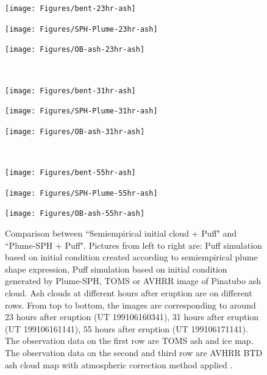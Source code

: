 \documentclass[draft,linenumbers]{agujournal2019}
\begin{document}
\begin{figure}[!htb]
    \centering
    \begin{minipage}{.325\textwidth}
        \centering
        \texttt{[image: Figures/bent-23hr-ash]}
    \end{minipage}%
    \begin{minipage}{.325 \textwidth}
        \centering
        \texttt{[image: Figures/SPH-Plume-23hr-ash]}
    \end{minipage}%
    \begin{minipage}{.325 \textwidth}
        \centering
        \texttt{[image: Figures/OB-ash-23hr-ash]}
    \end{minipage}%
    \\
        \begin{minipage}{.325\textwidth}
        \centering
        \texttt{[image: Figures/bent-31hr-ash]}
    \end{minipage}%
    \begin{minipage}{.325 \textwidth}
        \centering
        \texttt{[image: Figures/SPH-Plume-31hr-ash]}
    \end{minipage}%
    \begin{minipage}{.325 \textwidth}
        \centering
        \texttt{[image: Figures/OB-ash-31hr-ash]}
    \end{minipage}%
    \\
        \begin{minipage}{.325\textwidth}
        \centering
        \texttt{[image: Figures/bent-55hr-ash]}
    \end{minipage}%
    \begin{minipage}{.325 \textwidth}
        \centering
        \texttt{[image: Figures/SPH-Plume-55hr-ash]}
    \end{minipage}%
    \begin{minipage}{.325 \textwidth}
        \centering
        \texttt{[image: Figures/OB-ash-55hr-ash]}
    \end{minipage}%
    \caption{Comparison between ``Semiempirical initial cloud + Puff" and ``Plume-SPH + Puff". Pictures from left to right are: Puff simulation based on initial condition created according to semiempirical plume shape expression, Puff simulation based on initial condition generated by Plume-SPH, TOMS or AVHRR image of Pinatubo ash cloud. Ash clouds at different hours after eruption are on different rows. From top to bottom, the images are corresponding to around 23 hours after eruption (UT 199106160341), 31 hours after eruption (UT 199106161141), 55 hours after eruption (UT 199106171141). The observation data on the first row are TOMS ash and ice map. The observation data on the second and third row are AVHRR BTD ash cloud map with atmospheric correction method applied \citep{guo2004particles}.}
    \label{fig:Plume-SPH-Puff-ash-cloud}
\end{figure}
\end{document}
